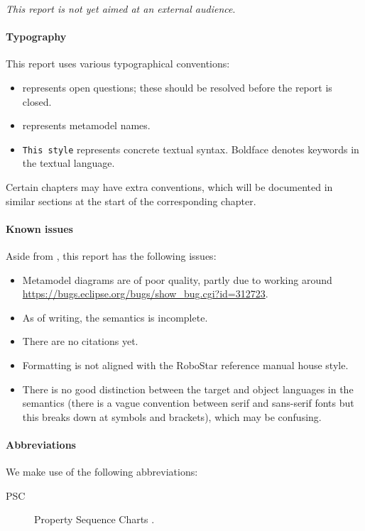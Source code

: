 
\emph{This report is not yet aimed at an external audience}.

\paragraph{Typography}
This report uses various typographical conventions:

\begin{itemize}
\item
	 represents open questions; these should be
	resolved before the report is closed.
\item
	 represents metamodel names.
\item
	\texttt{This style} represents concrete textual syntax.  Boldface
	denotes keywords in the textual language.
\end{itemize}

Certain chapters may have extra conventions, which will be documented in
similar sections at the start of the corresponding chapter.


\paragraph{Known issues}
Aside from , this report has the following issues:

\begin{itemize}
\item
	Metamodel diagrams are of poor quality, partly due to working around
	\url{https://bugs.eclipse.org/bugs/show_bug.cgi?id=312723}.
\item
	As of writing, the semantics is incomplete.
\item
	There are no citations yet.	
\item
	Formatting is not aligned with the RoboStar reference manual house
	style.
\item
	There is no good distinction between the target and object languages
	in the semantics (there is a vague convention between serif and
	sans-serif fonts but this breaks down at symbols and brackets),
	which may be confusing.
\end{itemize}

\paragraph{Abbreviations} We make use of the following abbreviations:

\begin{description}
	\item[PSC] Property Sequence Charts .
\end{description}
